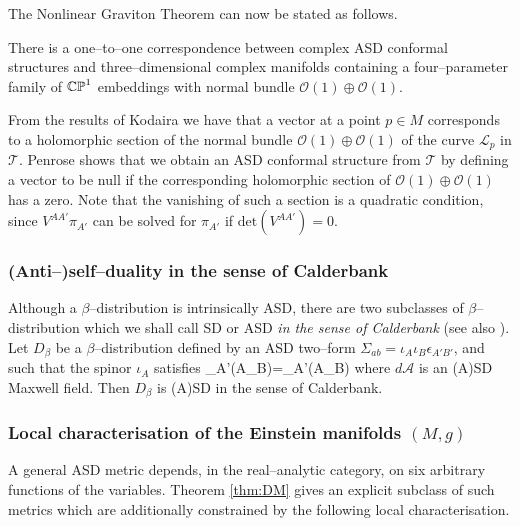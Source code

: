 The Nonlinear Graviton Theorem can now be stated as follows.
\begin{theo}
There is a one--to--one correspondence between complex ASD conformal structures and three--dimensional complex manifolds containing a four--parameter family of $\mathbb{CP}^1$ embeddings with normal bundle $\mathcal{O}(1)\oplus\mathcal{O}(1)$.
\end{theo}
\noindent
From the results of Kodaira \cite{Kodaira} we have that a vector at a point $p\in M$ corresponds to a holomorphic section of the normal bundle $\mathcal{O}(1)\oplus\mathcal{O}(1)$ of the curve $\mathscr{L}_p$ in $\mathscr{T}$. Penrose shows that we obtain an ASD conformal structure from $\mathscr{T}$ by defining a vector to be null if the corresponding holomorphic section of $\mathcal{O}(1)\oplus\mathcal{O}(1)$ has a zero. Note that the vanishing of such a section is a quadratic condition, since $V^{AA'}\pi_{A'}$ can be solved for $\pi_{A'}$ if $\mathrm{det}(V^{AA'})=0$.


\subsubsection{(Anti--)self--duality in the sense of Calderbank}
Although a $\beta$--distribution is intrinsically ASD, there are two subclasses of $\beta$--distribution which we shall call SD or ASD \textit{in the sense of Calderbank} \cite{Cal1} (see also \cite{West}). Let $D_\beta$ be a $\beta$--distribution defined by an ASD two--form $\Sigma_{ab}=\iota_A\iota_B\epsilon_{A'B'}$, and  such that the spinor $\iota_A$ satisfies
\be
\label{dm3}
\nabla_{A'(A}\iota_{B)}=_{A'(A}\iota_{B)}
\ee
where $d\mathcal{A}$ is an (A)SD Maxwell field. Then $D_\beta$ is (A)SD in the sense of Calderbank.

 
\subsubsection{Local characterisation of the Einstein manifolds $(M,g)$}

A general ASD metric depends, in the real--analytic category, on six arbitrary functions of the variables. Theorem \ref{thm:DM} gives an explicit subclass of such metrics which are additionally constrained by the following local characterisation.

